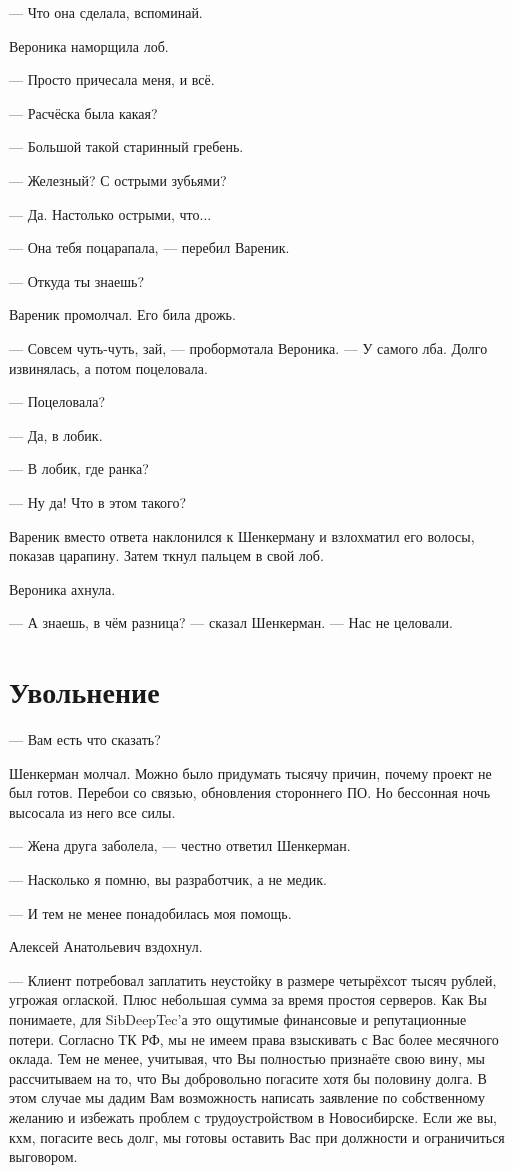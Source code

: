 \documentclass[a4paper,10pt,fleqn]{book}\usepackage{polyglossia}\setdefaultlanguage{english}\setotherlanguage{russian}\defaultfontfeatures{Ligatures=TeX,Mapping=tex-text} \usepackage{xcolor}\definecolor{lightgray}{HTML}{bbbbbb}\color{lightgray}\newcommand{\ml}[3]{\textcolor{black}{#3}}
\begin{document}
--- Что она сделала, вспоминай.

Вероника наморщила лоб.

--- Просто причесала меня, и всё.

--- Расчёска была какая?

--- Большой такой старинный гребень.

--- Железный?
С острыми зубьями?

--- Да.
Настолько острыми, что...

--- Она тебя поцарапала, --- перебил Вареник.

--- Откуда ты знаешь?

Вареник промолчал.
Его била дрожь.

--- Совсем чуть-чуть, зай, --- пробормотала Вероника.
--- У самого лба.
Долго извинялась, а потом поцеловала.

--- Поцеловала?

--- Да, в лобик.

--- В лобик, где ранка?

--- Ну да!
Что в этом такого?

Вареник вместо ответа наклонился к Шенкерману и взлохматил его волосы, показав царапину.
Затем ткнул пальцем в свой лоб.

Вероника ахнула.

--- А знаешь, в чём разница? --- сказал Шенкерман.
--- Нас не целовали.

\section{Увольнение}

--- Вам есть что сказать?

Шенкерман молчал.
Можно было придумать тысячу причин, почему проект не был готов.
Перебои со связью, обновления стороннего ПО.
Но бессонная ночь высосала из него все силы.

--- Жена друга заболела, --- честно ответил Шенкерман.

--- Насколько я помню, вы разработчик, а не медик.

--- И тем не менее понадобилась моя помощь.

Алексей Анатольевич вздохнул.

--- Клиент потребовал заплатить неустойку в размере четырёхсот тысяч рублей, угрожая оглаской.
Плюс небольшая сумма за время простоя серверов.
Как Вы понимаете, для SibDeepTec'а это ощутимые финансовые и репутационные потери.
Согласно ТК РФ, мы не имеем права взыскивать с Вас более месячного оклада.
Тем не менее, учитывая, что Вы полностью признаёте свою вину, мы рассчитываем на то, что Вы добровольно погасите хотя бы половину долга.
В этом случае мы дадим Вам возможность написать заявление по собственному желанию и избежать проблем с трудоустройством в Новосибирске.
Если же вы, кхм, погасите весь долг, мы готовы оставить Вас при должности и ограничиться выговором.
\end{document}

